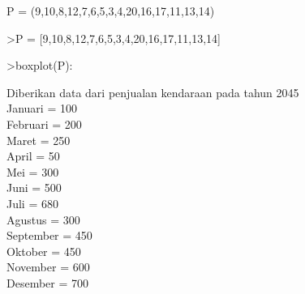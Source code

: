 \documentclass[a4paper,10pt]{article}
\begin{document}
\begin{eulernotebook}
\begin{eulercomment}
\begin{eulercomment}
\begin{eulercomment}
\begin{eulercomment}
\begin{eulercomment}
\begin{eulercomment}
\begin{eulercomment}
\begin{eulercomment}
\begin{eulercomment}
\begin{eulercomment}
\begin{eulercomment}
\begin{eulercomment}
\begin{eulercomment}
\begin{eulercomment}
\begin{eulercomment}
\begin{eulercomment}
\begin{eulercomment}
\begin{eulercomment}
\begin{eulercomment}
\begin{eulercomment}
\begin{eulercomment}
\begin{eulercomment}
\begin{eulercomment}
\begin{eulercomment}
\begin{eulercomment}
P = (9,10,8,12,7,6,5,3,4,20,16,17,11,13,14)
\end{eulercomment}
\begin{eulerprompt}
>P = [9,10,8,12,7,6,5,3,4,20,16,17,11,13,14]
\end{eulerprompt}
\begin{euleroutput}
  [9,  10,  8,  12,  7,  6,  5,  3,  4,  20,  16,  17,  11,  13,  14]
\end{euleroutput}
\begin{eulerprompt}
>boxplot(P):
\end{eulerprompt}
\begin{eulercomment}
Diberikan data dari penjualan kendaraan pada tahun 2045\\
Januari = 100\\
Februari = 200\\
Maret = 250\\
April = 50\\
Mei = 300\\
Juni = 500\\
Juli = 680\\
Agustus = 300\\
September = 450\\
Oktober = 450\\
November = 600\\
Desember = 700


\end{eulercomment}
\end{eulercomment}
\end{eulercomment}
\end{eulercomment}
\end{eulercomment}
\end{eulercomment}
\end{eulercomment}
\end{eulercomment}
\end{eulercomment}
\end{eulercomment}
\end{eulercomment}
\end{eulercomment}
\end{eulercomment}
\end{eulercomment}
\end{eulercomment}
\end{eulercomment}
\end{eulercomment}
\end{eulercomment}
\end{eulercomment}
\end{eulercomment}
\end{eulercomment}
\end{eulercomment}
\end{eulercomment}
\end{eulercomment}
\end{eulercomment}
\end{eulernotebook}
\end{document}
